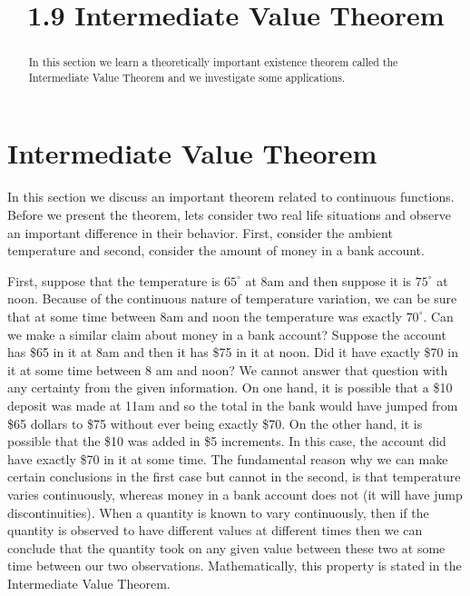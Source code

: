 \documentclass[handout]{ximera}
\title{1.9 Intermediate Value Theorem}
\begin{document}
\begin{abstract}
In this section we learn a theoretically important existence theorem called the Intermediate Value Theorem
and we investigate some applications.
\end{abstract}

\maketitle

\section{Intermediate Value Theorem}



In this section we discuss an important theorem related to continuous functions. Before we present the theorem, 
lets consider two real life situations and observe an important difference in their behavior. 
First, consider the ambient temperature and second, consider the amount of money in a bank account.

First, suppose that the temperature is $65^{\circ}$ at 8am and then suppose it is $75^{\circ}$ at noon. 
Because of the continuous nature of temperature variation, we can be sure that at some time 
between 8am and noon  the temperature was exactly $70^{\circ}$.
Can we make a similar claim about money in a bank account?  
Suppose the account has \$65  in it at 8am and then it has \$75 in it at noon.  
Did it have exactly \$70 in it at some time between 8 am and noon? 
We cannot answer that question with any certainty from the given information.  
On one hand, it is possible that a \$10 deposit was made at 11am and so the total in the 
bank would have jumped from \$65 dollars to \$75 without ever being exactly \$70. 
On the other hand, it is possible that the \$10 was added in \$5 increments. In this case, the account did have 
exactly \$70 in it at some time.
The fundamental reason why we can make certain conclusions in the first case but cannot in the second, 
is that temperature varies continuously, whereas money in a bank account does not 
(it will have jump discontinuities).  
When a quantity is known to vary continuously, then if the quantity is observed to have different 
values at different times then we can conclude that the quantity took on any given value between these 
two at some time between our two observations. Mathematically, this property is stated in the 
Intermediate Value Theorem.
\end{document}
